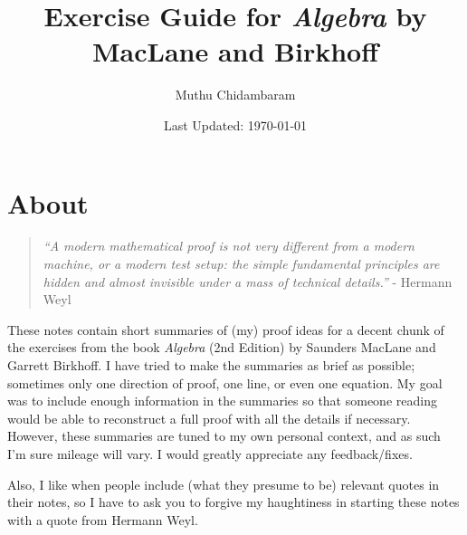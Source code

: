 \documentclass{article}
\begin{document}
\title{Exercise Guide for \textit{Algebra} by MacLane and Birkhoff}
\author{Muthu Chidambaram}
\date{Last Updated: \today}

\maketitle

\tableofcontents
\newpage 

\section*{About}

\begin{quote}
        \textit{``A modern mathematical proof is not very different from a modern machine,
or a modern test setup: the simple fundamental principles are hidden 
and almost invisible under a mass of technical details.''} - Hermann Weyl
\end{quote}

These notes contain short summaries of (my) proof ideas for a decent chunk of the exercises
from the book \textit{Algebra} (2nd Edition) by Saunders MacLane and Garrett Birkhoff.
I have tried to make the summaries as brief as possible; sometimes only one direction of proof, 
one line, or even one equation. My goal was to include enough information in the summaries so that
someone reading would be able to reconstruct a full proof with all the details if necessary.
However, these summaries are tuned to my own personal context, and as such I'm sure mileage will vary.
I would greatly appreciate any feedback/fixes.

Also, I like when people include (what they presume to be) relevant quotes in their notes, so I have to ask you to forgive my haughtiness in starting these notes with a quote from Hermann Weyl.


\end{document}
